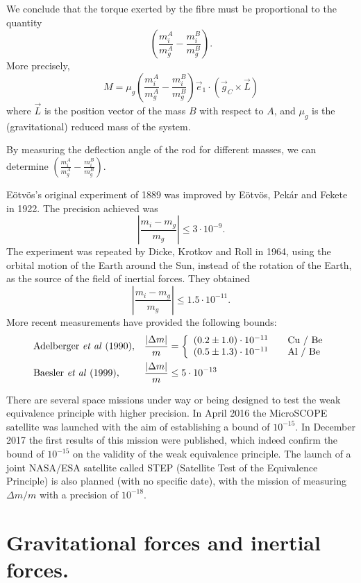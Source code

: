 \begin{points}
\item We conclude that the torque exerted by the fibre must be proportional to the quantity
\[
  \left(\frac{m_i^A}{m_g^A}-\frac{m_i^B}{m_g^B}\right).
\]
More precisely,
\[
  M=\mu_g\left(\frac{m_i^A}{m_g^A}-\frac{m_i^B}{m_g^B}\right)\vec e_1\cdot\left(\vec g_C\times\vec L\right)
\]
where $\vec L$ is the position vector of the mass $B$ with respect to $A$, and $\mu_g$ is the (gravitational) reduced mass of the system.

\item By measuring the deflection angle of the rod for different masses, we can determine $\left(\frac{m_i^A}{m_g^A}-\frac{m_i^B}{m_g^B}\right)$.

\item Eötvös's original experiment of 1889 was improved by Eötvös, Pekár and Fekete in 1922. The precision achieved was
\[
  \left|\frac{m_i-m_g}{m_g}\right|\leq3\cdot10^{-9}.
\]
The experiment was repeated by Dicke, Krotkov and Roll in 1964, using the orbital motion of the Earth around the Sun, instead of the rotation of the Earth, as the source of the field of inertial forces. They obtained
\[
  \left|\frac{m_i-m_g}{m_g}\right|\leq1.5\cdot10^{-11}.
\]
More recent measurements have provided the following bounds:
\begin{align*}
  &\text{Adelberger \emph{et al} (1990)}, && \frac{|\Delta m|}{m}=\left\{\begin{array}{ll}(0.2\pm1.0)\cdot10^{-11}&\quad\text{Cu / Be}\\(0.5\pm1.3)\cdot10^{-11}&\quad\text{Al / Be}\end{array}\right.\\
  &\text{Baesler \emph{et al} (1999)}, && \frac{|\Delta m|}{m}\leq5\cdot10^{-13}
\end{align*}

There are several space missions under way or being designed to test the weak equivalence principle with higher precision. In April 2016 the MicroSCOPE satellite was launched with the aim of establishing a bound of $10^{-15}$. In December 2017 the first results of this mission were published, which indeed confirm the bound of $10^{-15}$ on the validity of the weak equivalence principle. The launch of a joint NASA/ESA satellite called STEP (Satellite Test of the Equivalence Principle) is also planned (with no specific date), with the mission of measuring $\Delta m/m$ with a precision of $10^{-18}$.
\end{points}

\section{Gravitational forces and inertial forces.}

